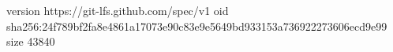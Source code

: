 version https://git-lfs.github.com/spec/v1
oid sha256:24f789bf2fa8e4861a17073e90c83e9e5649bd933153a736922273606ecd9e99
size 43840
